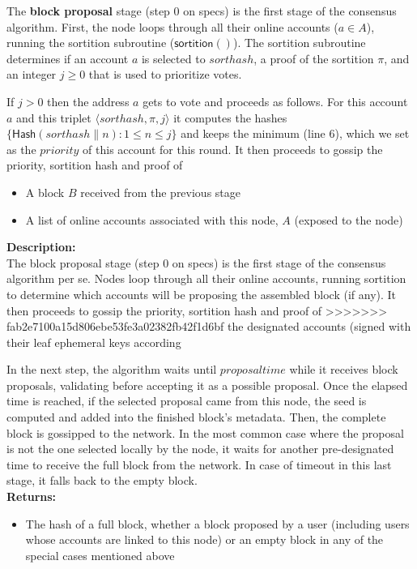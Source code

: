\documentclass[10pt,a4paper]{article}
\begin{document}
The {\bf block proposal} stage (step 0 on specs) is the first stage of the 
consensus algorithm. 
First, the node loops through all their online accounts ($a\in A$), 
running the sortition subroutine ($\mathsf{sortition}()$).
The sortition subroutine determines if an account $a$ is selected to 
${sorthash}$, a proof of the sortition $\pi$, and an integer $j\ge 0$
that is used to prioritize votes.

If $j>0$ then the address $a$ gets to vote and proceeds as follows.
For this account $a$ and this triplet $\langle sorthash, \pi, j\rangle$
it computes the hashes $\{ \mathsf{Hash}(sorthash \| n):1\le n\le j\}$
and keeps the minimum (line 6), which we set as the $priority$ of this
account for this round. 
It then proceeds to gossip the priority, sortition hash and proof of 

\begin{itemize}
    \item A block $B$ received from the previous stage
    \item A list of online accounts associated with this node, $A$ (exposed to the node)
  \end{itemize}
\noindent \textbf{Description:}\\
The block proposal stage (step 0 on specs) is the first stage of the 
consensus algorithm per se. Nodes loop through all their online accounts, 
running sortition to determine which accounts will be proposing the 
assembled block (if any).
It then proceeds to gossip the priority, sortition hash and proof of 
>>>>>>> fab2e7100a15d806ebe53fe3a02382fb42f1d6bf
the designated accounts (signed with their leaf ephemeral keys according 

In the next step, the algorithm waits until $proposal time$ while it receives 
block proposals, 
validating before accepting it as a possible proposal.
Once the elapsed time is reached, if the selected proposal came from this node, 
the seed is computed and added into the finished block's metadata. 
Then, the complete block is gossipped to the network.
In the most common case where the proposal is not the one selected 
locally by the node, it waits for another pre-designated time to 
receive the full block from the network.
In case of timeout in this last stage, it falls back to the empty block.\\

\noindent \textbf{Returns:}
\begin{itemize}
    \item The hash of a full block, whether a block proposed by a user (including users whose accounts are 
    linked to this node) or an empty block in any of the special cases mentioned above
  \end{itemize}
\end{document}
